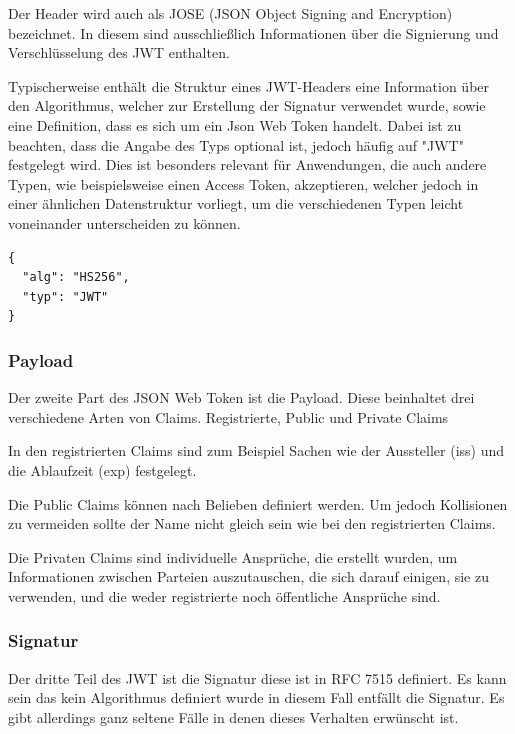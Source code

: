Der Header wird auch als JOSE (JSON Object Signing and Encryption) bezeichnet. In diesem sind ausschließlich Informationen über die Signierung und Verschlüsselung des JWT enthalten.


Typischerweise enthält die Struktur eines JWT-Headers eine Information über den Algorithmus, welcher zur Erstellung der Signatur verwendet wurde, sowie eine Definition, dass es sich um ein Json Web Token handelt. Dabei ist zu beachten, dass die Angabe des Typs optional ist, jedoch häufig auf "JWT" festgelegt wird. Dies ist besonders relevant für Anwendungen, die auch andere Typen, wie beispielsweise einen Access Token, akzeptieren, welcher jedoch in einer ähnlichen Datenstruktur vorliegt, um die verschiedenen Typen leicht voneinander unterscheiden zu können.

\begin{lstlisting}
{
  "alg": "HS256",
  "typ": "JWT"
}
\end{lstlisting}

\subsubsection{Payload}
Der zweite Part des JSON Web Token ist die Payload. Diese beinhaltet drei verschiedene Arten von Claims. 
Registrierte, Public und Private Claims

In den registrierten Claims sind zum Beispiel Sachen wie der Aussteller (iss) und die Ablaufzeit (exp) festgelegt.

Die Public Claims können nach Belieben definiert werden. Um jedoch Kollisionen zu vermeiden sollte der Name nicht gleich sein wie bei den registrierten Claims.

Die Privaten Claims sind individuelle Ansprüche, die erstellt wurden, um Informationen zwischen Parteien auszutauschen, die sich darauf einigen, sie zu verwenden, und die weder registrierte noch öffentliche Ansprüche sind.


\subsubsection{Signatur}

Der dritte Teil des JWT ist die Signatur diese ist in RFC 7515 definiert. Es kann sein das kein Algorithmus definiert wurde in diesem Fall entfällt die Signatur. Es gibt allerdings ganz seltene Fälle in denen dieses Verhalten erwünscht ist. 

\newline

